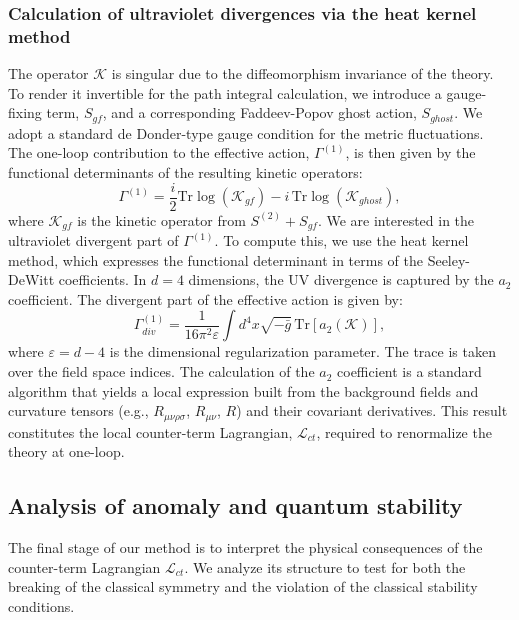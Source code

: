 \documentclass[twocolumn]{aastex631}
\begin{document}
\subsubsection{Calculation of ultraviolet divergences via the heat kernel method}
The operator $\mathcal{K}$ is singular due to the diffeomorphism invariance of the theory. To render it invertible for the path integral calculation, we introduce a gauge-fixing term, $S_{gf}$, and a corresponding Faddeev-Popov ghost action, $S_{ghost}$. We adopt a standard de Donder-type gauge condition for the metric fluctuations. The one-loop contribution to the effective action, $\Gamma^{(1)}$, is then given by the functional determinants of the resulting kinetic operators:
\begin{equation}
    \Gamma^{(1)} = \frac{i}{2} \text{Tr} \log(\mathcal{K}_{gf}) - i \, \text{Tr} \log(\mathcal{K}_{ghost}),
\end{equation}
where $\mathcal{K}_{gf}$ is the kinetic operator from $S^{(2)} + S_{gf}$. We are interested in the ultraviolet divergent part of $\Gamma^{(1)}$. To compute this, we use the heat kernel method, which expresses the functional determinant in terms of the Seeley-DeWitt coefficients. In $d=4$ dimensions, the UV divergence is captured by the $a_2$ coefficient. The divergent part of the effective action is given by:
\begin{equation}
    \Gamma^{(1)}_{div} = \frac{1}{16\pi^2 \varepsilon} \int d^4x \sqrt{-\bar{g}} \, \text{Tr}[a_2(\mathcal{K})],
\end{equation}
where $\varepsilon = d-4$ is the dimensional regularization parameter. The trace is taken over the field space indices. The calculation of the $a_2$ coefficient is a standard algorithm that yields a local expression built from the background fields and curvature tensors (e.g., $R_{\mu\nu\rho\sigma}$, $R_{\mu\nu}$, $R$) and their covariant derivatives. This result constitutes the local counter-term Lagrangian, $\mathcal{L}_{ct}$, required to renormalize the theory at one-loop.

\subsection{Analysis of anomaly and quantum stability}
The final stage of our method is to interpret the physical consequences of the counter-term Lagrangian $\mathcal{L}_{ct}$. We analyze its structure to test for both the breaking of the classical symmetry and the violation of the classical stability conditions.
\end{document}

